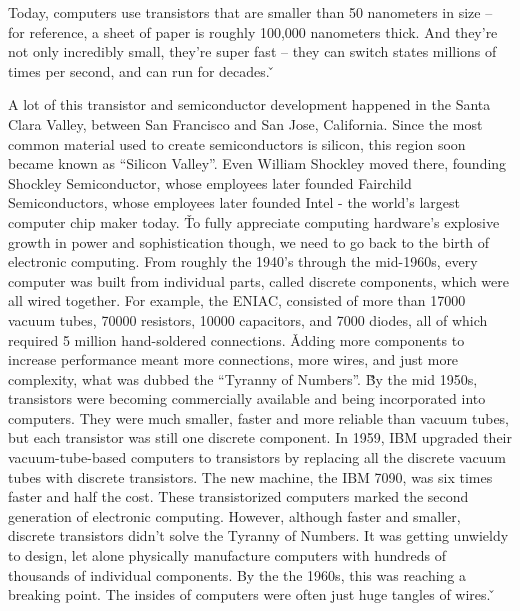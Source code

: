 
Today, computers use transistors that are smaller than 50 nanometers in size – for reference, a sheet of paper is
roughly 100,000 nanometers thick. And they're not only incredibly small, they're super fast – they can switch states
millions of times per second, and can run for decades. \v


A lot of this transistor and semiconductor development happened in the Santa Clara Valley, between San Francisco and
San Jose, California. Since the most common material used to create semiconductors is silicon, this region soon
became known as ``Silicon Valley''. Even William Shockley moved there, founding Shockley Semiconductor, whose
employees later founded Fairchild Semiconductors, whose employees later founded Intel - the world's largest computer
chip maker today. \v

To fully appreciate computing hardware's explosive growth in power and sophistication though, we need to go back to
the birth of electronic computing. From roughly the 1940's through the mid-1960s, every computer was built from
individual parts, called discrete components, which were all wired together. For example, the ENIAC, consisted of
more than 17000 vacuum tubes, 70000 resistors, 10000 capacitors, and 7000 diodes, all of which required 5 million
hand-soldered connections. \v

Adding more components to increase performance meant more connections, more wires, and just more complexity, what was
dubbed the ``Tyranny of Numbers''. \v

By the mid 1950s, transistors were becoming commercially available and being incorporated into computers. They were
much smaller, faster and more reliable than vacuum tubes, but each transistor was still one discrete component. In
1959, IBM upgraded their vacuum-tube-based computers to transistors by replacing all the discrete vacuum tubes with
discrete transistors. The new machine, the IBM 7090, was six times faster and half the cost. These transistorized
computers marked the second generation of electronic computing. However, although faster and smaller, discrete
transistors didn't solve the Tyranny of Numbers. It was getting unwieldy to design, let alone physically manufacture
computers with hundreds of thousands of individual components. By the the 1960s, this was reaching a breaking point.
The insides of computers were often just huge tangles of wires. \v

